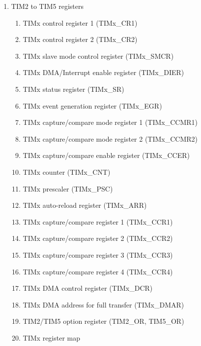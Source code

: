 \documentclass{article}
\begin{document}
\begin{enumerate}
\begin{enumerate}
\begin{enumerate}
            \item Encoder interface mode 
            \item Timer input XOR function 
            \item Timers and external trigger synchronization 
            \item Timer synchronization 
            \item Debug mode 
        \end{enumerate}
        \item TIM2 to TIM5 registers 
        \begin{enumerate}
            \item TIMx control register 1 (TIMx\_CR1) 
            \item TIMx control register 2 (TIMx\_CR2) 
            \item TIMx slave mode control register (TIMx\_SMCR) 
            \item TIMx DMA/Interrupt enable register (TIMx\_DIER) 
            \item TIMx status register (TIMx\_SR) 
            \item TIMx event generation register (TIMx\_EGR) 
            \item TIMx capture/compare mode register 1 (TIMx\_CCMR1) 
            \item TIMx capture/compare mode register 2 (TIMx\_CCMR2) 
            \item TIMx capture/compare enable register (TIMx\_CCER) 
            \item TIMx counter (TIMx\_CNT) 
            \item TIMx prescaler (TIMx\_PSC) 
            \item TIMx auto-reload register (TIMx\_ARR) 
            \item TIMx capture/compare register 1 (TIMx\_CCR1) 
            \item TIMx capture/compare register 2 (TIMx\_CCR2) 
            \item TIMx capture/compare register 3 (TIMx\_CCR3) 
            \item TIMx capture/compare register 4 (TIMx\_CCR4) 
            \item TIMx DMA control register (TIMx\_DCR) 
            \item TIMx DMA address for full transfer (TIMx\_DMAR) 
            \item TIM2/TIM5 option register (TIM2\_OR, TIM5\_OR) 
            \item TIMx register map 
        \end{enumerate}
    \end{enumerate}
\end{enumerate}
\end{document}
